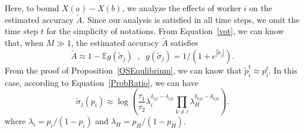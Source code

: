 Here, to bound $X(a)-X(b)$, we analyze the effects of worker $i$ on the estimated accuracy $\tilde{A}$.
Since our analysis is satisfied in all time steps, we omit the time step $t$ for the simplicity of notations.
From Equation~\ref{vot}, we can know that, when $M\gg 1$, the estimated accuracy $\tilde{A}$ satisfies
\begin{equation}
\label{accP}
\tilde{A} \approx 1-\mathbb{E}g(\tilde{\sigma}_j)\;\;,\;\; g(\tilde{\sigma}_j)=1/(1+e^{|\tilde{\sigma}_j|}).
\end{equation}
From the proof of Proposition~\ref{OSEqulibrium}, we can know that $\tilde{p}^{t}_i \approx p^{t}_i$.
In this case, according to Equation~\ref{ProbRatio}, we can have
\begin{equation}
\label{ProbRatioApp}
\tilde{\sigma}_j(p_i)\approx \log\left(\frac{\tau_{1}}{\tau_{2}}\lambda_i^{\delta_{ij1}-\delta_{ij2}}{\prod}_{k\neq i}\lambda_H^{\delta_{kj1}-\delta_{kj2}}\right).
\end{equation}
where $\lambda_i=p_i/(1-p_i)$ and $\lambda_H=p_H/(1-p_H)$.


